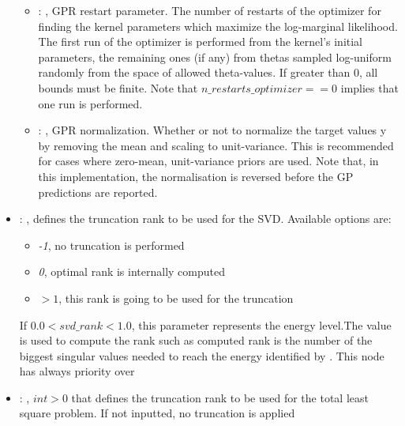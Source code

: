 \begin{itemize}
\begin{itemize}
        \item {}: ,
          GPR restart parameter. The number of restarts of the optimizer for finding the
          kernel parameters which maximize the log-marginal likelihood. The first run of the
          optimizer                                                  is performed from the kernel’s
          initial parameters, the remaining ones (if any) from thetas
          sampled log-uniform randomly from the space of allowed theta-values. If greater than 0,
          all bounds must be finite. Note that $n\_restarts\_optimizer == 0$ implies that one run is
          performed.

        \item {}: ,
          GPR normalization. Whether or not to normalize the target values y by removing the mean
          and scaling                                                  to unit-variance. This is
          recommended for cases where zero-mean, unit-variance priors are used.
          Note that, in this implementation, the normalisation is reversed before the GP predictions
          are reported.
      \end{itemize}

    \item {}: ,
      defines the truncation rank to be used for the SVD.
      Available options are:                                                  \begin{itemize}
      \item \textit{-1}, no truncation is performed
      \item \textit{0}, optimal rank is internally computed
      \item \textit{$>1$}, this rank is going to be used for the truncation
      \end{itemize}                                                  If $0.0 < svd\_rank < 1.0$, this
      parameter represents the energy level.The value is used to compute the rank such
      as computed rank is the number of the biggest singular values needed to reach the energy
      identified by                                                    . This
      node has always priority over  

    \item {}: ,
      $int > 0$ that defines the truncation rank to be used for the total
      least square problem. If not inputted, no truncation is applied


\end{itemize}
